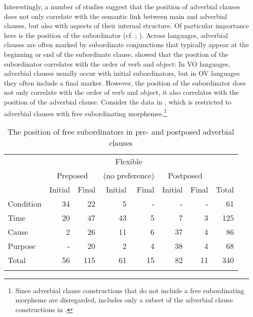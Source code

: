 \documentclass[output=paper]{langsci/langscibook}
\begin{document}
Interestingly, a number of studies suggest that the position of adverbial clauses does not only correlate with the semantic link between main and adverbial clauses, but also with aspects of their internal structure. Of particular importance here is the position of the subordinator (cf. \citealt{Diessel2001}; \citealt{Schmidtke-Bode2009,Hetterle2015}). Across languages, adverbial clauses are often marked by subordinate conjunctions that typically appear at the beginning or end of the subordinate clause. \citet{Dryer1992} showed that the position of the subordinator correlates with the order of verb and object: In VO languages, adverbial clauses usually occur with initial subordinators, but in OV languages they often include a final marker. However, the position of the subordinator does not only correlate with the order of verb and object, it also correlates with the position of the adverbial clause. Consider the data in , which is restricted to adverbial clauses with free subordinating morphemes.\footnote{Since adverbial clause constructions that do not include a free subordinating morpheme are disregarded,  includes only a subset of the adverbial clause constructions in .} 

\begin{table}
\begin{tabularx}{\textwidth}{X rr  rr rr  r}
\lsptoprule
& & & \multicolumn{2}{c}{Flexible}\\
& \multicolumn{2}{c}{Preposed} &  \multicolumn{2}{c}{(no preference)} &  \multicolumn{2}{c}{Postposed} \\
\cmidrule(lr){2-3}\cmidrule(lr){4-5}\cmidrule(lr){6-7}
&   Initial &   Final &   Initial &   Final &   Initial &   Final & Total\\
\midrule
{Condition} 	& 34 	& 22 	& 5 	& - 	& - 	& - 	& 61\\
{Time} 		& 20 	& 47 	& 43 	& 5 	& 7 	& 3 	& 125\\
{Cause} 	& 2 	& 26 	& 11 	& 6 	& 37 	& 4 	& 86\\
{Purpose} 	& - 	& 20 	& 2 	& 4 	& 38 	& 4 	& 68\\
\midrule
{Total} 	& 56 	& 115 	& 61 	& 15 	& 82 	& 11 	& 340\\
\lspbottomrule
\end{tabularx}

\caption{The position of free subordinators in pre- and postposed adverbial clauses}
\label{tab:diessel:3}
\end{table}
\end{document}
